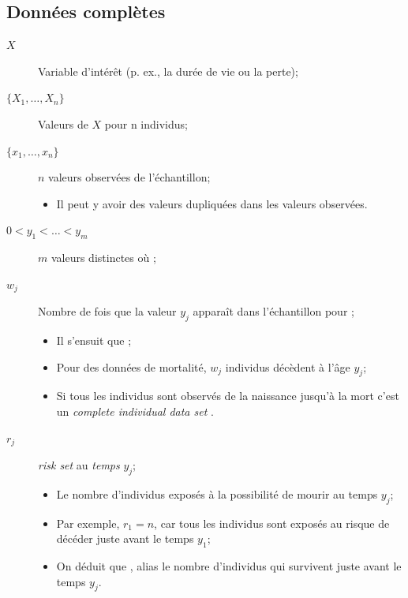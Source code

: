 \documentclass[10pt, french]{article}
\begin{document}
\begin{multicols*}{2}
\columnbreak
\subsection{Données complètes}
\begin{distributions}[Notation]
\begin{description}
	\item[$X$]	Variable d'intérêt (p. ex., la durée de vie ou la perte);
	\item[$\{X_{1}, \dots, X_{n}\}$]	Valeurs de $X$ pour n individus;
	\item[$\{x_{1}, \dots, x_{n}\}$]	$n$ valeurs observées de l'échantillon;
		\begin{itemize}[leftmargin = *]
		\item	Il peut y avoir des valeurs dupliquées dans les valeurs observées.
		\end{itemize}
	\item[$0	<	y_{1}	<	\hdots	<	y_{m}$]	$m$ valeurs distinctes où ;
	\item[$w_{j}$]	Nombre de fois que la valeur $y_{j}$ apparaît dans l'échantillon pour ;
		\begin{itemize}[leftmargin = *]
		\item	Il s'ensuit que ;
		\item	Pour des données de mortalité, $w_{j}$ individus décèdent à l'âge $y_{j}$;
		\item	Si tous les individus sont observés de la naissance jusqu'à la mort c'est un \og \textit{complete individual data set} \fg{}.
		\end{itemize}
	\item[$r_{j}$]	\og \textit{risk set} \fg{} au \textit{temps} $y_{j}$;
		\begin{itemize}[leftmargin = *]
		\item	Le nombre d'individus exposés à la possibilité de mourir au temps $y_{j}$;
		\item	Par exemple, $r_{1}	=	n$, car tous les individus sont exposés au risque de décéder juste avant le temps $y_{1}$;
		\item	On déduit que , alias le nombre d'individus qui survivent juste avant le temps $y_{j}$.
		\end{itemize}
\end{description}
\end{distributions}


\end{multicols*}
\end{document}
